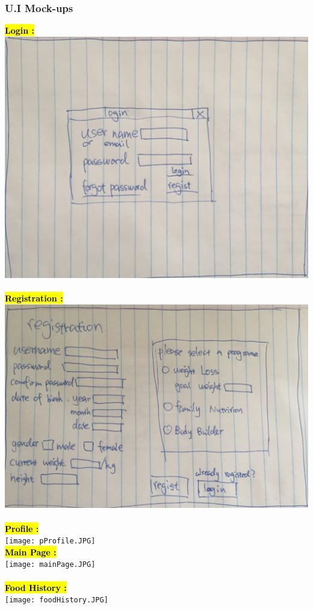 \documentclass[a4paper,12pt]{article}
\begin{document}
\subsubsection{U.I Mock-ups}
\hl{\textbf{Login :}}\\
\includegraphics[scale=0.3]{login.png}\\
\\
\newpage
\hl{\textbf{Registration :}}\\
\includegraphics[scale=0.3]{regist.png}\\
\\
\hl{\textbf{Profile :}}\\
\texttt{[image: pProfile.JPG]}\\
\newpage
\hl{\textbf{Main Page :}}\\
\texttt{[image: mainPage.JPG]}\\
\\
\hl{\textbf{Food History :}}\\
\texttt{[image: foodHistory.JPG]}\\
\end{document}
